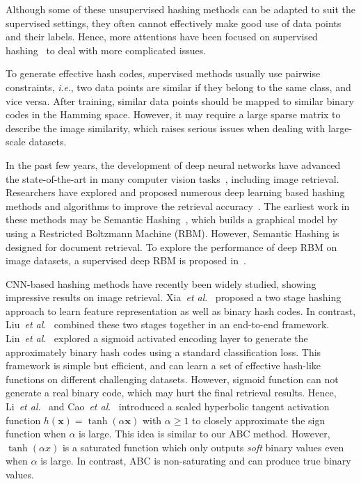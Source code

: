 \documentclass[runningheads]{llncs}
\newcommand{\etal}{\textit{et al}.}
\newcommand{\ie}{\textit{i}.\textit{e}.}
\begin{document}
Although some of these unsupervised hashing methods can be adapted to suit the supervised settings, they often cannot effectively make good use of data points and their labels. Hence, more attentions have been focused on supervised hashing~\cite{Liu12CVPR_r6,Norouzi11ICML_r7,Shen15CVPR_r8} to deal with more complicated issues.

To generate effective hash codes, supervised methods usually use pairwise constraints, \ie, two data points are similar if they belong to the same class, and vice versa. After training, similar data points should be mapped to similar binary codes in the Hamming space. However, it may require a large sparse matrix to describe the image similarity, which raises serious issues when dealing with large-scale datasets.

In the past few years, the development of deep neural networks have advanced the state-of-the-art in many computer vision tasks~\cite{AlexNet,ResNet}, including image retrieval. Researchers have explored and proposed numerous deep learning based hashing methods and algorithms to improve the retrieval accuracy~\cite{Salakhutdinov09_r9,Torralba08CVPR_r10,Xia14AAAI_r11,Liu16CVPR_r12,Lin15CVPRW_r13,Li17ACMMM_r14,Cao17ICCV_r15}. The earliest work in these methods may be Semantic Hashing~\cite{Salakhutdinov09_r9}, which  builds a graphical model by using a Restricted Boltzmann Machine (RBM). However, Semantic Hashing is designed for document retrieval. To explore the performance of deep RBM on image datasets, a supervised deep RBM is proposed in~\cite{Torralba08CVPR_r10}.

CNN-based hashing methods have recently been widely studied, showing impressive results on image retrieval. Xia~\etal~\cite{Xia14AAAI_r11} proposed a two stage hashing approach to learn feature representation as well as binary hash codes. In contrast, Liu~\etal~\cite{Liu16CVPR_r12} combined these two stages together in an end-to-end framework. Lin~\etal~\cite{Lin15CVPRW_r13} explored a sigmoid activated encoding layer to generate the approximately binary hash codes using a standard classification loss. This framework is simple but efficient, and can learn a set of effective hash-like functions on different challenging datasets. However, sigmoid function can not generate a real binary code, which may hurt the final retrieval results. Hence, Li~\etal~\cite{Li17ACMMM_r14} and Cao~\etal~\cite{Cao17ICCV_r15} introduced a scaled hyperbolic tangent activation function $h(\mathbf{x})=\tanh(\alpha \mathbf{x})$ with $\alpha \ge 1$ to closely approximate the sign function when $\alpha$ is large. This idea is similar to our ABC method. However, $\tanh(\alpha x)$ is a saturated function which only outputs \emph{soft} binary values even when $\alpha$ is large. In contrast, ABC is non-saturating and can produce true binary values.
\end{document}
